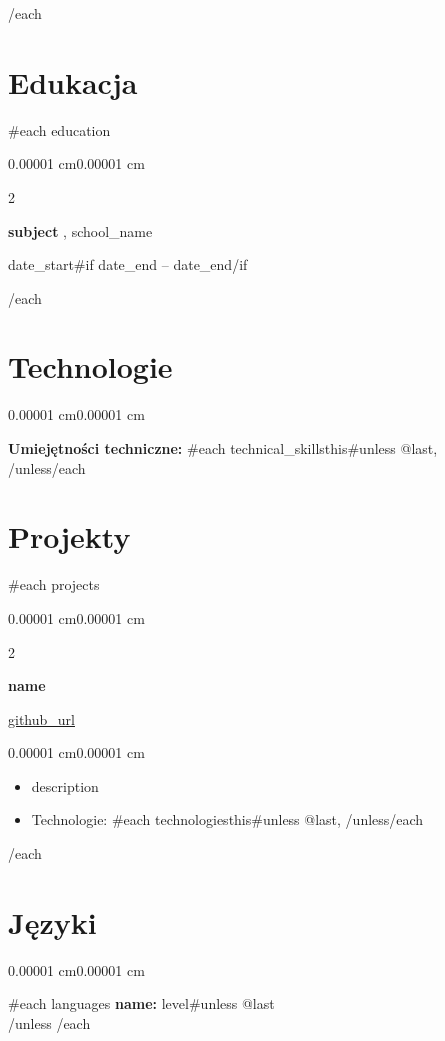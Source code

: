 \documentclass[10pt, letterpaper]{article}
\newenvironment{highlights}{
    \begin{itemize}[
        topsep=0.10 cm,
        parsep=0.10 cm,
        partopsep=0pt,
        itemsep=0pt,
        leftmargin=10pt
    ]
}{
    \end{itemize}
}
\newenvironment{onecolentry}{
    \begin{adjustwidth}{0.00001 cm}{0.00001 cm}
}{
    \end{adjustwidth}
}
\newenvironment{twocolentry}[2][]{
    \onecolentry
    \def\secondColumn{#2}
    \setcolumnwidth{\fill, 4.5 cm}
    \begin{paracol}{2}
}{
    \switchcolumn \raggedleft \secondColumn
    \end{paracol}
    \endonecolentry
}
\begin{document}
\vspace{0.2cm}
{{/each}}

\section{Edukacja}

{{#each education}}
\begin{twocolentry}{ {{date_start}}{{#if date_end}} -- {{date_end}}{{/if}} }
    \textbf{ {{subject}} }, {{school_name}}
\end{twocolentry}

\vspace{0.2cm}
{{/each}}

\section{Technologie}

\begin{onecolentry}
    \textbf{Umiejętności techniczne:} {{#each technical_skills}}{{this}}{{#unless @last}}, {{/unless}}{{/each}}
\end{onecolentry}

\section{Projekty}

{{#each projects}}
\begin{twocolentry}{\href{ {{github_url}} }{ {{github_url}} }}
    \textbf{ {{name}} }
\end{twocolentry}

\vspace{0.1cm}
\begin{onecolentry}
    \begin{highlights}
        \item {{description}}
        \item Technologie: {{#each technologies}}{{this}}{{#unless @last}}, {{/unless}}{{/each}}
    \end{highlights}
\end{onecolentry}
{{/each}}

\section{Języki}

\begin{onecolentry}
    {{#each languages}}
    \textbf{ {{name}}:} {{level}}{{#unless @last}} \\ {{/unless}}
    {{/each}}
\end{onecolentry}
\end{document}

